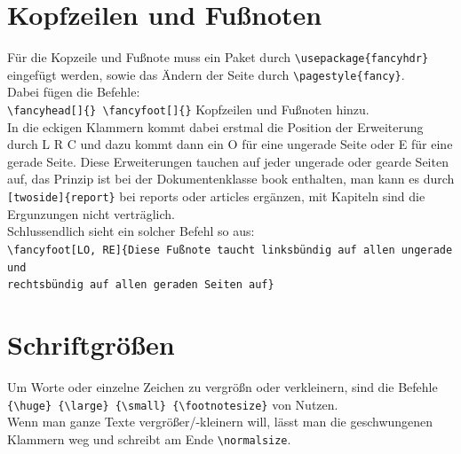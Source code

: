 \documentclass[ngerman]{scrreport}
\begin{document}
\section{Kopfzeilen und Fußnoten}
Für die Kopzeile und Fußnote muss ein Paket durch {\color{blue}\verb|\usepackage{fancyhdr}|} eingefügt werden, sowie das Ändern der Seite durch {\color{blue}\verb|\pagestyle{fancy}|}.\\
Dabei fügen die Befehle:\\
{\color{blue}\verb|\fancyhead[]{} \fancyfoot[]{}|} Kopfzeilen und Fußnoten hinzu.\\
In die eckigen Klammern kommt dabei erstmal die Position der Erweiterung durch {\color{blue}L R C} und dazu kommt dann ein {\color{blue}O} für eine ungerade Seite oder {\color{blue}E} für eine gerade Seite.
Diese Erweiterungen tauchen auf jeder ungerade oder gearde Seiten auf, das Prinzip ist bei der Dokumentenklasse book enthalten, man kann es durch {\color{blue}\verb|[twoside]{report}|} bei reports oder articles ergänzen, mit Kapiteln sind die Ergunzungen  nicht verträglich.\\
Schlussendlich sieht ein solcher Befehl so aus:\\
{\color{blue}\verb|\fancyfoot[LO, RE]{Diese Fußnote taucht linksbündig auf allen ungerade und|}\\
{\color{blue}\verb|rechtsbündig auf allen geraden Seiten auf}|}

\section{Schriftgrößen}
Um Worte oder einzelne Zeichen zu vergrößn oder verkleinern, sind die Befehle {\color{blue}\verb|{\huge} {\large} {\small} {\footnotesize}|} von Nutzen.\\
Wenn man ganze Texte vergrößer/-kleinern will, lässt man die geschwungenen Klammern weg und schreibt am Ende {\color{blue}\verb|\normalsize|}.

\newpage
\end{document}
